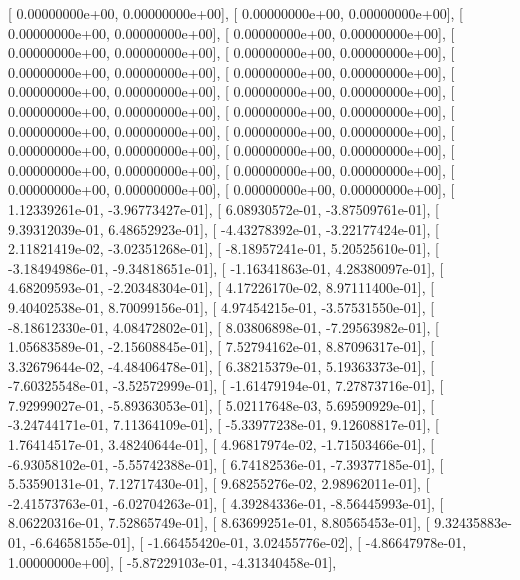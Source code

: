 \documentclass{article}
\begin{document}
       [  0.00000000e+00,   0.00000000e+00],
       [  0.00000000e+00,   0.00000000e+00],
       [  0.00000000e+00,   0.00000000e+00],
       [  0.00000000e+00,   0.00000000e+00],
       [  0.00000000e+00,   0.00000000e+00],
       [  0.00000000e+00,   0.00000000e+00],
       [  0.00000000e+00,   0.00000000e+00],
       [  0.00000000e+00,   0.00000000e+00],
       [  0.00000000e+00,   0.00000000e+00],
       [  0.00000000e+00,   0.00000000e+00],
       [  0.00000000e+00,   0.00000000e+00],
       [  0.00000000e+00,   0.00000000e+00],
       [  0.00000000e+00,   0.00000000e+00],
       [  0.00000000e+00,   0.00000000e+00],
       [  0.00000000e+00,   0.00000000e+00],
       [  0.00000000e+00,   0.00000000e+00],
       [  0.00000000e+00,   0.00000000e+00],
       [  0.00000000e+00,   0.00000000e+00],
       [  0.00000000e+00,   0.00000000e+00],
       [  0.00000000e+00,   0.00000000e+00],
       [  1.12339261e-01,  -3.96773427e-01],
       [  6.08930572e-01,  -3.87509761e-01],
       [  9.39312039e-01,   6.48652923e-01],
       [ -4.43278392e-01,  -3.22177424e-01],
       [  2.11821419e-02,  -3.02351268e-01],
       [ -8.18957241e-01,   5.20525610e-01],
       [ -3.18494986e-01,  -9.34818651e-01],
       [ -1.16341863e-01,   4.28380097e-01],
       [  4.68209593e-01,  -2.20348304e-01],
       [  4.17226170e-02,   8.97111400e-01],
       [  9.40402538e-01,   8.70099156e-01],
       [  4.97454215e-01,  -3.57531550e-01],
       [ -8.18612330e-01,   4.08472802e-01],
       [  8.03806898e-01,  -7.29563982e-01],
       [  1.05683589e-01,  -2.15608845e-01],
       [  7.52794162e-01,   8.87096317e-01],
       [  3.32679644e-02,  -4.48406478e-01],
       [  6.38215379e-01,   5.19363373e-01],
       [ -7.60325548e-01,  -3.52572999e-01],
       [ -1.61479194e-01,   7.27873716e-01],
       [  7.92999027e-01,  -5.89363053e-01],
       [  5.02117648e-03,   5.69590929e-01],
       [ -3.24744171e-01,   7.11364109e-01],
       [ -5.33977238e-01,   9.12608817e-01],
       [  1.76414517e-01,   3.48240644e-01],
       [  4.96817974e-02,  -1.71503466e-01],
       [ -6.93058102e-01,  -5.55742388e-01],
       [  6.74182536e-01,  -7.39377185e-01],
       [  5.53590131e-01,   7.12717430e-01],
       [  9.68255276e-02,   2.98962011e-01],
       [ -2.41573763e-01,  -6.02704263e-01],
       [  4.39284336e-01,  -8.56445993e-01],
       [  8.06220316e-01,   7.52865749e-01],
       [  8.63699251e-01,   8.80565453e-01],
       [  9.32435883e-01,  -6.64658155e-01],
       [ -1.66455420e-01,   3.02455776e-02],
       [ -4.86647978e-01,   1.00000000e+00],
       [ -5.87229103e-01,  -4.31340458e-01],
\end{document}

